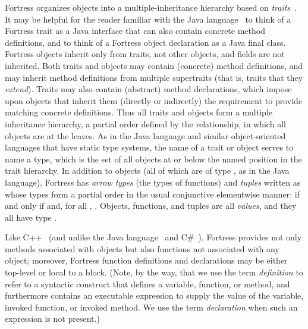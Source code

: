 Fortress organizes objects into a multiple-inheritance hierarchy based
on {\it traits}~\cite{traits,traitsOOPSLA04}.  It may be helpful for the reader familiar with the Java language~\cite{JLS1}
to think of a Fortress trait as a Java interface that can
also contain concrete method definitions, and
to think of a Fortress object declaration as a Java final class.
Fortress objects inherit only from traits, not other objects,
and fields are not inherited.  Both traits and objects may contain
(concrete) method definitions, and may inherit method definitions
from multiple supertraits (that is, traits that they \emph{extend}).
Traits may also contain (abstract) method declarations, which impose
upon objects that inherit them (directly or indirectly)
the requirement to provide matching concrete definitions.
Thus all traits and objects form a multiple inheritance hierarchy,
a partial order defined by the  relationship,
in which all objects are at the leaves.  As in the Java language and similar object-oriented
languages that have static type systems, the name of a trait or object
serves to name a type, which is the set of all objects at or below
the named position in the trait hierarchy.  In addition to objects
(all of which are of type , as in the Java language), Fortress has
\emph{arrow types}  (the types of functions) and \emph{tuples}
written as  whose types form a partial order
in the usual conjunctive elementwise manner:
 if and only if
 and, for all , .  Objects, functions, and tuples
are all \emph{values}, and they all have type .

Like C++~\cite{C-PLUS-PLUS} (and unlike the Java language~\cite{JLS1}
and C\#~\cite{CSHARP-ECMA-334-2001}), Fortress provides not
only methods associated with objects but also functions not associated with
any object; moreover, Fortress function definitions and declarations may be either
top-level or local to a block.  (Note, by the way, that we use the term
\emph{definition} to refer to a syntactic construct that defines a variable, function,
or method, and furthermore contains an executable expression to supply
the value of the variable, invoked function, or invoked method.
We use the term \emph{declaration} when such an expression is not present.)

